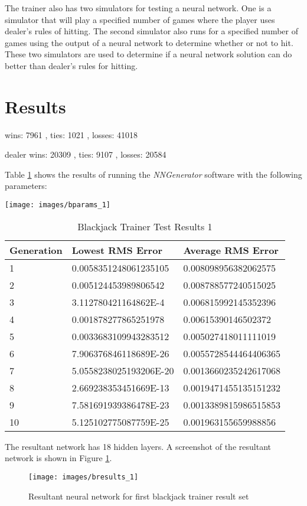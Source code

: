 The trainer also has two simulators for testing a neural network.
One is a simulator that will play a specified number of games where
the player uses dealer's rules of hitting.
The second simulator also runs for a specified number of games using
the output of a neural network to determine whether or not to hit.
These two simulators are used to determine if a neural network
solution can do better than dealer's rules for hitting.

\section{Results}

wins:  7961 , ties:  1021 , losses:  41018

dealer wins:  20309 , ties:  9107 , losses:  20584


Table \ref{btr1} shows the results of running the {\it NNGenerator} software with the following parameters:

\begin{center}
\texttt{[image: images/bparams\_1]}
\end{center}

\begin{center}
    \begin{longtable}{ | l | l | l |}
      \caption{Blackjack Trainer Test Results 1} \label{btr1} \\
   \hline
  Generation & Lowest RMS Error & Average RMS Error \\ \hline
1 &	0.0058351248061235105 &	0.008098956382062575 \\ \hline
2 &	0.005124453989806542 &	0.008788577240515025 \\ \hline
3 &	3.112780421164862E-4 &	0.006815992145352396 \\ \hline
4 &	0.001878277865251978 &	0.00615390146502372 \\ \hline
5 &	0.0033683109943283512 &	0.005027418011111019 \\ \hline
6 &	7.906376846118689E-26 &	0.0055728544464406365 \\ \hline
7 &	5.0558238025193206E-20 &	0.0013660235242617068 \\ \hline
8 &	2.669238353451669E-13 &	0.0019471455135151232 \\ \hline
9 &	7.581691939386478E-23 &	0.0013389815986515853 \\ \hline
10 &	5.125102775087759E-25 &	0.001963155659988856 \\ \hline
\end{longtable}
\end{center}

The resultant network has 18 hidden layers.
A screenshot of the resultant network is shown in Figure \ref{bresults_1}.

\begin{figure}[h!]
  \centering
  \texttt{[image: images/bresults\_1]}
  \caption{Resultant neural network for first blackjack trainer result set}
  \label{bresults_1}
\end{figure}


